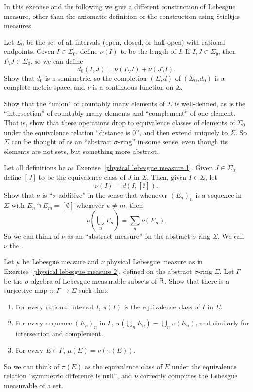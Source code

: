 \begin{exercise}\label{physical lebesgue measure 1}
In this exercise and the following we give a different construction of Lebesgue measure, other than the axiomatic definition or the construction using Stieltjes measures.

Let $\Sigma_{0}$ be the set of all intervals (open, closed, or half-open) with rational endpoints.
Given $I \in \Sigma_{0}$, define $\nu(I)$ to be the length of $I$.
If $I, J \in \Sigma_{0}$, then $I \setminus J \in \Sigma_{0}$, so we can define
\[d_{0}(I, J) = \nu(I \setminus J) + \nu(J \setminus I).\]
Show that $d_{0}$ is a semimetric, so the completion $(\Sigma, d)$ of $(\Sigma_{0}, d_{0})$ is a complete metric space, and $\nu$ is a continuous function on $\Sigma$.

Show that the ``union'' of countably many elements of $\Sigma$ is well-defined, as is the ``intersection'' of countably many elements and ``complement'' of one element.
That is, show that these operations drop to equivalence classes of elements of $\Sigma_{0}$ under the equivalence relation ``distance is $0$'', and then extend uniquely to $\Sigma$.
So $\Sigma$ can be thought of as an ``abstract $\sigma$-ring'' in some sense, even though its elements are not sets, but something more abstract.
\end{exercise}

\begin{exercise}\label{physical lebesgue measure 2}
Let all definitions be as Exercise~\ref{physical lebesgue measure 1}.
Given $J \in \Sigma_{0}$, define $[J]$ to be the equivalence class of $J$ in $\Sigma$.
Then, given $I \in \Sigma$, let
\[\nu(I) = d(I, [\emptyset]).\]
Show that $\nu$ is ``$\sigma$-additive'' in the sense that whenever ${(E_{n})}_{n}$ is a sequence in $\Sigma$ with $E_{n} \cap E_{m} = [\emptyset]$ whenever $n \neq m$, then
\[\nu\left(\bigcup_{n} E_{n}\right) = \sum_{n} \nu(E_{n}).\]
So we can think of $\nu$ as an ``abstract measure'' on the abstract $\sigma$-ring $\Sigma$.
We call $\nu$ the .
\end{exercise}

\begin{exercise}\label{physical lebesgue measure 3}
Let $\mu$ be Lebesgue measure and $\nu$ physical Lebesgue measure as in Exercise~\ref{physical lebesgue measure 2}, defined on the abstract $\sigma$-ring $\Sigma$.
Let $\Gamma$ be the $\sigma$-algebra of Lebesgue measurable subsets of $\mathbb{R}$. Show that there is a surjective map $\pi: \Gamma \to \Sigma$ such that:
\begin{enumerate}
\item For every rational interval $I$, $\pi(I)$ is the equivalence class of $I$ in $\Sigma$.
\item For every sequence ${(E_{n})}_{n}$ in $\Gamma$, $\pi(\bigcup_{n} E_{n}) = \bigcup_{n} \pi(E_{n})$, and similarly for intersection and complement.
\item For every $E \in \Gamma$, $\mu(E) = \nu(\pi(E))$.
\end{enumerate}
So we can think of $\pi(E)$ as the equivalence class of $E$ under the equivalence relation ``symmetric difference is null'', and $\nu$ correctly computes the Lebesgue measurable of a set.
\end{exercise}

